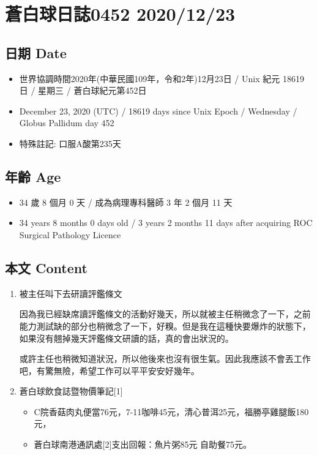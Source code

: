 \documentclass[a5paper, 11pt
]{book}
\providecommand{\tightlist}{%
  \setlength{\itemsep}{0pt}\setlength{\parskip}{0pt}}
\begin{document}
\hypertarget{ux84bcux767dux7403ux65e5ux8a8c0452-20201223}{%
\section{蒼白球日誌0452
2020/12/23}\label{ux84bcux767dux7403ux65e5ux8a8c0452-20201223}}

\hypertarget{ux65e5ux671f-date-22}{%
\subsection{日期 Date}\label{ux65e5ux671f-date-22}}

\begin{itemize}
\tightlist
\item
  世界協調時間2020年(中華民國109年，令和2年)12月23日 / Unix 紀元 18619
  日 / 星期三 / 蒼白球紀元第452日
\item
  December 23, 2020 (UTC) / 18619 days since Unix Epoch / Wednesday /
  Globus Pallidum day 452
\item
  特殊註記: 口服A酸第235天
\end{itemize}

\hypertarget{ux5e74ux9f61-age-22}{%
\subsection{年齡 Age}\label{ux5e74ux9f61-age-22}}

\begin{itemize}
\tightlist
\item
  34 歲 8 個月 0 天 / 成為病理專科醫師 3 年 2 個月 11 天
\item
  34 years 8 months 0 days old / 3 years 2 months 11 days after
  acquiring ROC Surgical Pathology Licence
\end{itemize}

\hypertarget{ux672cux6587-content-22}{%
\subsection{本文 Content}\label{ux672cux6587-content-22}}

\begin{enumerate}
\def\labelenumi{\arabic{enumi}.}
\item
  被主任叫下去研讀評鑑條文

  因為我已經缺席讀評鑑條文的活動好幾天，所以就被主任稍微念了一下，之前能力測試缺的部分也稍微念了一下，好糗。但是我在這種快要爆炸的狀態下，如果沒有翹掉幾天評鑑條文研讀的話，真的會出狀況的。

  或許主任也稍微知道狀況，所以他後來也沒有很生氣。因此我應該不會丟工作吧，有驚無險，希望工作可以平平安安好幾年。
\item
  蒼白球飲食誌暨物價筆記{[}1{]}

  \begin{itemize}
  \tightlist
  \item
    C院香菇肉丸便當76元，7-11咖啡45元，清心普洱25元，福勝亭雞腿飯180元，
  \item
    蒼白球南港通訊處{[}2{]}支出回報：魚片粥85元 自助餐75元。
  \end{itemize}
\end{enumerate}
\end{document}

